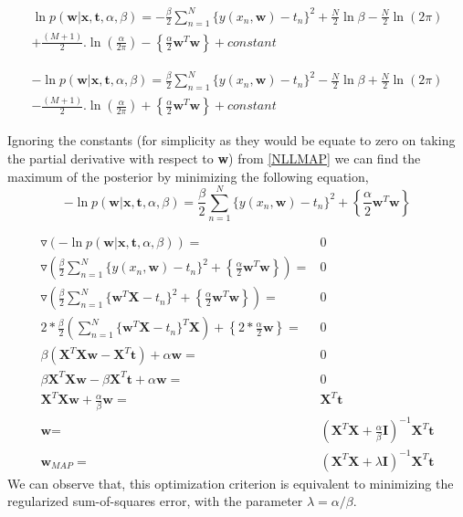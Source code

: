 \documentclass[12pt,twoside,a4paper]{article}
\begin{document}
\begin{multline}
        \ln p(\textbf{w}|\textbf{x},\textbf{t},\alpha,\beta) = -\frac{\beta}{2}\sum_{n=1}^{N} {\{y(x_n,\textbf{w})-t_n\}^2} + \frac{N}{2}\ln\beta - \frac{N}{2}\ln(2\pi) \\ + \frac{(M+1)}{2}.\ln\left( \frac{\alpha}{2\pi}\right) - \left\{ \frac{\alpha}{2}\textbf{w}^T\textbf{w}\right\} + constant
\end{multline}

\begin{multline} \label{NLLMAP}
       - \ln p(\textbf{w}|\textbf{x},\textbf{t},\alpha,\beta) = \frac{\beta}{2}\sum_{n=1}^{N} {\{y(x_n,\textbf{w})-t_n\}^2} - \frac{N}{2}\ln\beta + \frac{N}{2}\ln(2\pi) \\ - \frac{(M+1)}{2}.\ln\left( \frac{\alpha}{2\pi}\right) + \left\{ \frac{\alpha}{2}\textbf{w}^T\textbf{w}\right\} + constant
\end{multline}

Ignoring the constants (for simplicity as they would be equate to zero on taking the partial derivative with respect to \textbf{w}) from \eqref{NLLMAP} we can find the maximum of the posterior by minimizing the following equation,
\begin{equation}
     - \ln p(\textbf{w}|\textbf{x},\textbf{t},\alpha,\beta) = \frac{\beta}{2}\sum_{n=1}^{N} {\{y(x_n,\textbf{w})-t_n\}^2} + \left\{ \frac{\alpha}{2}\textbf{w}^T\textbf{w}\right\} 
\end{equation}

\begin{align}
    \triangledown \left(- \ln p(\textbf{w}|\textbf{x},\textbf{t},\alpha,\beta) \right ) =& 0 \\
    \triangledown \left( \frac{\beta}{2}\sum_{n=1}^{N} {\{y(x_n,\textbf{w})-t_n\}^2} + \left\{ \frac{\alpha}{2}\textbf{w}^T\textbf{w}\right\}  \right ) =& 0 \\
    \triangledown \left( \frac{\beta}{2}\sum_{n=1}^{N} {\{ \textbf{w}^T\textbf{X}-t_n\}^2} + \left\{ \frac{\alpha}{2}\textbf{w}^T\textbf{w}\right\}  \right ) =& 0 \\
    2*\frac{\beta}{2}\left ( \sum_{n=1}^{N} {\{ \textbf{w}^T\textbf{X}-t_n\}^T\textbf{X}} \right) + \left\{ 2*\frac{\alpha}{2}\textbf{w}\right\} =& 0 \\
    \beta( \textbf{X}^T\textbf{X}\textbf{w}-\textbf{X}^T\textbf{t})+ \alpha\textbf{w} =& 0 \\
    \beta\textbf{X}^T\textbf{X}\textbf{w}-\beta\textbf{X}^T\textbf{t}+ \alpha\textbf{w} =& 0 \\
    \textbf{X}^T\textbf{X}\textbf{w}+ \frac{\alpha}{\beta}\textbf{w} =& \textbf{X}^T\textbf{t} \\
 \textbf{w} =& \left(\textbf{X}^T\textbf{X} + \frac{\alpha}{\beta}\textbf{I}\right)^{-1}\textbf{X}^T\textbf{t} \\
 \textbf{w}_{MAP} =& \left(\textbf{X}^T\textbf{X} + \lambda\textbf{I}\right)^{-1}\textbf{X}^T\textbf{t}
\end{align}
We can observe that, this optimization criterion is equivalent to minimizing the regularized sum-of-squares error, with the parameter $\lambda = \alpha/\beta$.
\end{document}
